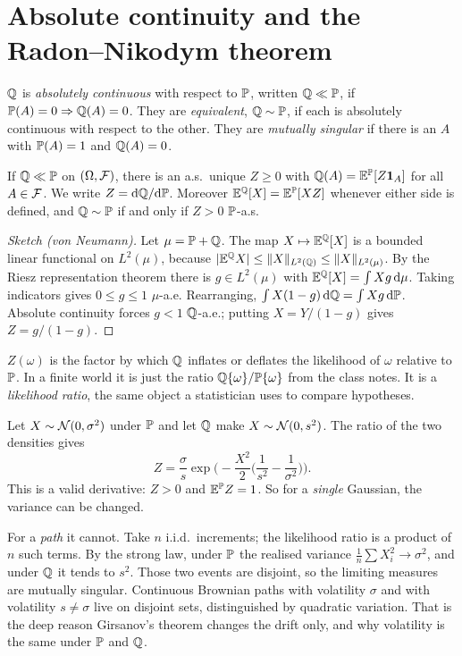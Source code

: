 \section{Absolute continuity and the Radon--Nikodym theorem}

\begin{definition}
$\mathbb{Q}$ is \emph{absolutely continuous} with respect to $\mathbb{P}$, written $\mathbb{Q}\ll\mathbb{P}$, if $\mathbb{P}(A)=0\Rightarrow\mathbb{Q}(A)=0$. They are \emph{equivalent}, $\mathbb{Q}\sim\mathbb{P}$, if each is absolutely continuous with respect to the other. They are \emph{mutually singular} if there is an $A$ with $\mathbb{P}(A)=1$ and $\mathbb{Q}(A)=0$.
\end{definition}

\begin{theorem}\label{thm:rn}
If $\mathbb{Q}\ll\mathbb{P}$ on $(\Omega,\mathcal{F})$, there is an a.s.\ unique $Z\ge0$ with $\mathbb{Q}(A)=\mathbb{E}^{\mathbb{P}}[Z\mathbf{1}_A]$ for all $A\in\mathcal{F}$. We write $Z=\mathrm{d}\mathbb{Q}/\mathrm{d}\mathbb{P}$. Moreover $\mathbb{E}^{\mathbb{Q}}[X]=\mathbb{E}^{\mathbb{P}}[XZ]$ whenever either side is defined, and $\mathbb{Q}\sim\mathbb{P}$ if and only if $Z>0$ $\mathbb{P}$-a.s.
\end{theorem}
\begin{proof}[Sketch (von Neumann)]
Let $\mu=\mathbb{P}+\mathbb{Q}$. The map $X\mapsto\mathbb{E}^{\mathbb{Q}}[X]$ is a bounded linear functional on $L^2(\mu)$, because $|\mathbb{E}^{\mathbb{Q}} X|\le\|X\|_{L^2(\mathbb{Q})}\le\|X\|_{L^2(\mu)}$. By the Riesz representation theorem there is $g\in L^2(\mu)$ with $\mathbb{E}^{\mathbb{Q}}[X]=\int Xg\,\mathrm{d}\mu$. Taking indicators gives $0\le g\le1$ $\mu$-a.e. Rearranging, $\int X(1-g)\,\mathrm{d}\mathbb{Q}=\int Xg\,\mathrm{d}\mathbb{P}$. Absolute continuity forces $g<1$ $\mathbb{Q}$-a.e.; putting $X=Y/(1-g)$ gives $Z=g/(1-g)$.
\end{proof}

\begin{intuition}
$Z(\omega)$ is the factor by which $\mathbb{Q}$ inflates or deflates the likelihood of $\omega$ relative to $\mathbb{P}$. In a finite world it is just the ratio $\mathbb{Q}\{\omega\}/\mathbb{P}\{\omega\}$ from the class notes. It is a \emph{likelihood ratio}, the same object a statistician uses to compare hypotheses.
\end{intuition}

\begin{example}\label{ex:variance}
Let $X\sim\mathcal{N}(0,\sigma^2)$ under $\mathbb{P}$ and let $\mathbb{Q}$ make $X\sim\mathcal{N}(0,s^2)$. The ratio of the two densities gives
\[
Z=\frac{\sigma}{s}\exp\!\Big(-\frac{X^2}{2}\Big(\frac1{s^2}-\frac1{\sigma^2}\Big)\Big).
\]
This is a valid derivative: $Z>0$ and $\mathbb{E}^{\mathbb{P}} Z=1$. So for a \emph{single} Gaussian, the variance can be changed.

For a \emph{path} it cannot. Take $n$ i.i.d.\ increments; the likelihood ratio is a product of $n$ such terms. By the strong law, under $\mathbb{P}$ the realised variance $\frac1n\sum X_i^2\to\sigma^2$, and under $\mathbb{Q}$ it tends to $s^2$. Those two events are disjoint, so the limiting measures are mutually singular. Continuous Brownian paths with volatility $\sigma$ and with volatility $s\ne\sigma$ live on disjoint sets, distinguished by quadratic variation. That is the deep reason Girsanov's theorem changes the drift only, and why volatility is the same under $\mathbb{P}$ and $\mathbb{Q}$.
\end{example}

